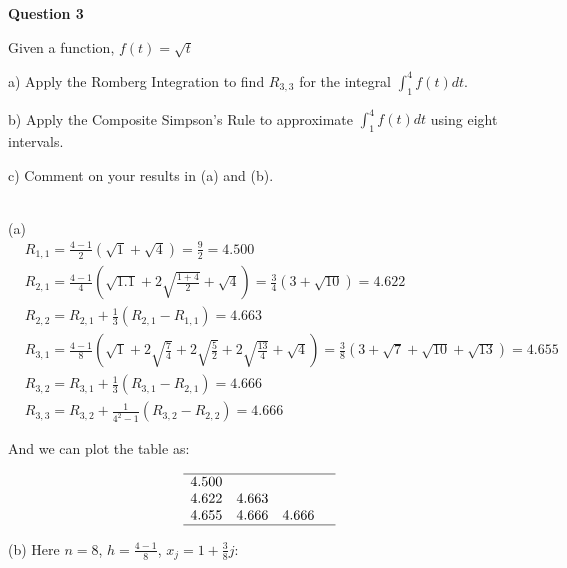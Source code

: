 

\begin{tcolorbox}
\textbf{Question 3} 

Given a function, $f(t)=\sqrt{t}$


a) Apply the Romberg Integration to find $R_{3,3}$ for the integral $\int_{1}^{4} f(t) d t$.


b) Apply the Composite Simpson's Rule to approximate $\int_{1}^{4} f(t) d t$ using eight intervals.


c) Comment on your results in (a) and (b).

\end{tcolorbox}

\begin{solution}\ \\

(a)
\begin{equation}
\begin{aligned}
&R_{1,1}=\frac{4-1}{2}(\sqrt{1}+\sqrt{4})=\frac{9}{2}=4.500 \\
&R_{2,1}=\frac{4-1}{4}\left(\sqrt{1.1}+2 \sqrt{\frac{1+4}{2}}+\sqrt{4}\right)=\frac{3}{4}(3+\sqrt{10})=4.622 \\
&R_{2,2}=R_{2,1}+\frac{1}{3}\left(R_{2,1}-R_{1,1}\right)=4.663 \\
&R_{3,1}=\frac{4-1}{8}\left(\sqrt{1}+2 \sqrt{\frac{7}{4}}+2 \sqrt{\frac{5}{2}}+2 \sqrt{\frac{13}{4}}+\sqrt{4}\right)=\frac{3}{8}(3+\sqrt{7}+\sqrt{10}+\sqrt{13})=4.655 \\
&R_{3,2}=R_{3,1}+\frac{1}{3}\left(R_{3,1}-R_{2,1}\right)=4.666 \\
&R_{3,3}=R_{3,2}+\frac{1}{4^{2}-1}\left(R_{3,2}-R_{2,2}\right)=4.666
\end{aligned}
\end{equation}



And we can plot the table as:


\begin{equation*}
\begin{array}{lll}
\hline
4.500 & & \\
4.622 & 4.663 & \\
4.655 & 4.666 \quad 4.666 \\
\hline
\end{array}
\end{equation*}

\dotfill



(b) Here $n=8$, $h=\frac{4-1}{8}$, $x_{j}=1+\frac{3}{8} j$:



\end{solution}
